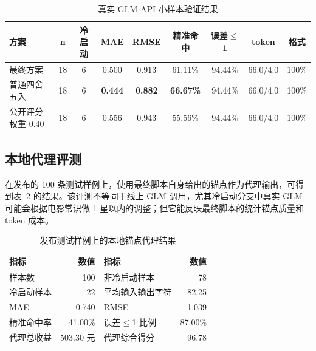 \documentclass[UTF8,a4paper,10pt,fontset=none]{ctexart}
\begin{document}
\begin{table}[htbp]
    \centering
    \setlength{\tabcolsep}{4.2pt}
    \caption{真实 GLM API 小样本验证结果}
    \label{tab:api_validation}
    \small
    \begin{tabular}{@{}lcccccccc@{}}
        \toprule
        \textbf{方案} & \textbf{n} & \textbf{冷启动} & \textbf{MAE} & \textbf{RMSE} & \textbf{精准命中} & \textbf{误差$\le$1} & \textbf{token} & \textbf{格式} \\
        \midrule
        最终方案 & 18 & 6 & 0.500 & 0.913 & 61.11\% & 94.44\% & 66.0/4.0 & 100\% \\
        普通四舍五入 & 18 & 6 & \textbf{0.444} & \textbf{0.882} & \textbf{66.67\%} & 94.44\% & 66.0/4.0 & 100\% \\
        公开评分权重 0.40 & 18 & 6 & 0.556 & 0.943 & 55.56\% & 94.44\% & 66.0/4.0 & 100\% \\
        \bottomrule
    \end{tabular}
\end{table}

\subsection{本地代理评测}

在发布的 100 条测试样例上，使用最终脚本自身给出的锚点作为代理输出，可得到表~\ref{tab:local_test} 的结果。该评测不等同于线上 GLM 调用，尤其冷启动分支中真实 GLM 可能会根据电影常识做 1 星以内的调整；但它能反映最终脚本的统计锚点质量和 token 成本。

\begin{table}[htbp]
    \centering
    \setlength{\tabcolsep}{12pt}
    \caption{发布测试样例上的本地锚点代理结果}
    \label{tab:local_test}
    \small
    \begin{tabular}{@{}lrlr@{}}
        \toprule
        \textbf{指标} & \textbf{数值} & \textbf{指标} & \textbf{数值} \\
        \midrule
        样本数 & 100 & 非冷启动样本 & 78 \\
        冷启动样本 & 22 & 平均输入输出字符 & 82.25 \\
        MAE & 0.740 & RMSE & 1.039 \\
        精准命中率 & 41.00\% & 误差$\le$1 比例 & 87.00\% \\
        代理总收益 & 503.30 元 & 代理综合得分 & 96.78 \\
        \bottomrule
    \end{tabular}
\end{table}
\end{document}
